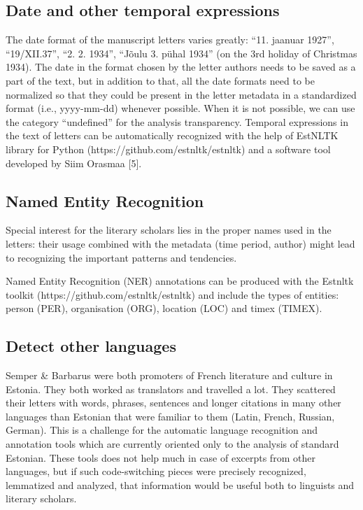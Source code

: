 \documentclass[runningheads]{llncs}
\begin{document}
\subsection{Date and other temporal expressions}

The date format of the manuscript letters varies greatly: “11. jaanuar 1927”, “19/XII.37”, “2. 2. 1934”, “Jõulu 3. pühal 1934” (on the 3rd holiday of Christmas 1934). The date in the format chosen by the letter authors needs to be saved as a part of the text, but in addition to that, all the date formats need to be normalized so that they could be present in the letter metadata in a standardized format (i.e., yyyy-mm-dd) whenever possible. When it is not possible, we can use the category “undefined” for the analysis transparency. Temporal expressions in the text of letters can be automatically recognized with the help of EstNLTK library for Python (https://github.com/estnltk/estnltk) and a software tool developed by Siim Orasmaa [5]. 

\subsection{Named Entity Recognition}

Special interest for the literary scholars lies in the proper names used in the letters: their usage combined with the metadata (time period, author) might lead to recognizing the important patterns and tendencies. 

Named Entity Recognition (NER) annotations can be produced with the Estnltk toolkit (https://github.com/estnltk/estnltk) and include the types of entities: person (PER), organisation (ORG), location (LOC) and timex (TIMEX). 

\subsection{Detect other languages}

Semper \& Barbarus were both promoters of French literature and culture in Estonia. They both worked as translators and travelled a lot. They scattered their letters with words, phrases, sentences and longer citations in many other languages than Estonian that were familiar to them (Latin, French, Russian, German). This is a challenge for the automatic language recognition and annotation tools which are currently oriented only to the analysis of standard Estonian. These tools does not help much in case of excerpts from other languages, but if such code-switching pieces were precisely recognized, lemmatized and analyzed, that information would be useful both to linguists and literary scholars.
\end{document}
